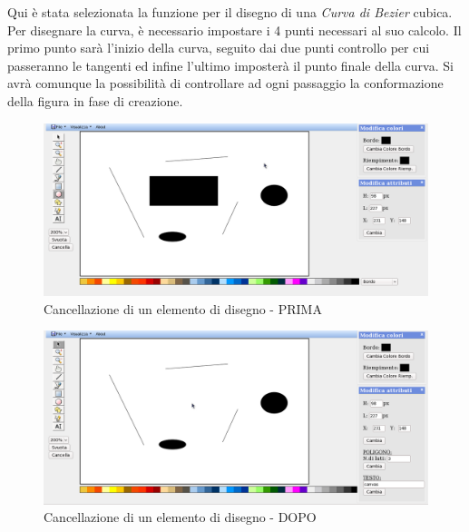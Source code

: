 \vspace{100pt}
 
Qui \`e stata selezionata la funzione per il disegno di una \textit{Curva di Bezier} cubica. Per disegnare la curva, \` e necessario impostare i 4 punti necessari al suo calcolo. Il primo punto sar\`a l'inizio della curva, seguito dai due punti controllo per cui passeranno le tangenti ed infine l'ultimo imposter\` a il punto finale della curva. Si avr\` a comunque la possibilit\` a di controllare ad ogni passaggio la conformazione della figura in fase di creazione.
 
\newpage
 
 
 
 
\begin{figure}[!ht]
\centering
\includegraphics[scale=0.4]{images/cancella_elemento_prima.png}
\caption{Cancellazione di un elemento di disegno - PRIMA}
\end{figure}
 
\begin{figure}[!ht]
\centering
\includegraphics[scale=0.4]{images/cancella_elemento_dopo.png}
\caption{Cancellazione di un elemento di disegno - DOPO}
\end{figure}
 
